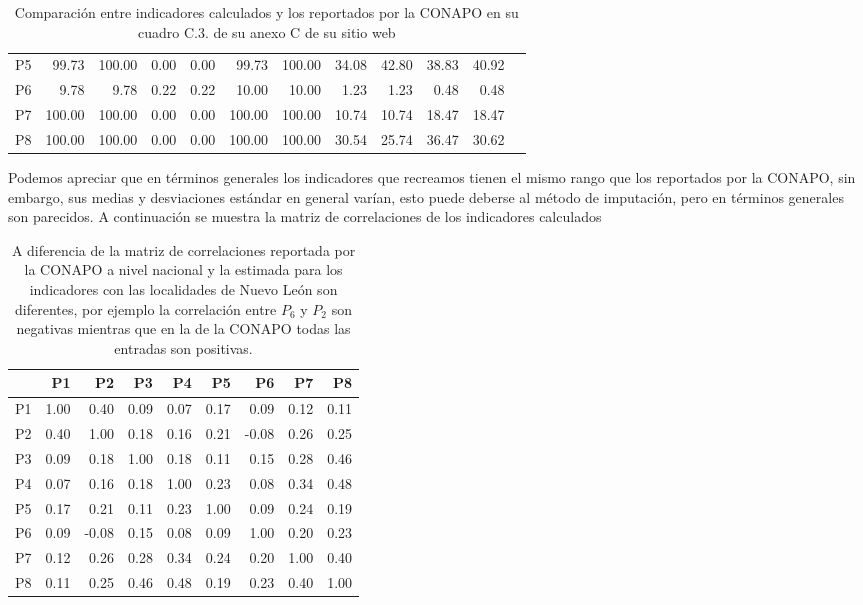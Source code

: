 \documentclass[paper=letter, fontsize=11pt]{scrartcl}
\numberwithin{equation}{section} %
\numberwithin{figure}{section} %
\numberwithin{table}{section} %
\begin{document}
\begin{enumerate}
\begin{enumerate}
\begin{table}[ht]
\begin{tabular}{rrrrrrrrrrrl}
  P5 & 99.73 & 100.00 & 0.00 & 0.00 & 99.73 & 100.00 & 34.08 & 42.80 & 38.83 & 40.92  \\ 
  P6 & 9.78 & 9.78 & 0.22 & 0.22 & 10.00 & 10.00 & 1.23 & 1.23 & 0.48 & 0.48 \\ 
  P7 & 100.00 & 100.00 & 0.00 & 0.00 & 100.00 & 100.00 & 10.74 & 10.74 & 18.47 & 18.47  \\ 
  P8 & 100.00 & 100.00 & 0.00 & 0.00 & 100.00 & 100.00 & 30.54 & 25.74 & 36.47 & 30.62  \\ 
   \hline
\end{tabular}
\caption{Comparación entre indicadores calculados y los reportados por la CONAPO en su cuadro C.3. de su anexo C de su sitio web }
\end{table}

Podemos apreciar que en términos generales los indicadores que recreamos tienen el mismo rango que los reportados por la CONAPO, sin embargo, sus medias y desviaciones estándar en general varían, esto puede deberse al método de imputación, pero en términos generales son parecidos. A continuación se muestra la matriz de correlaciones de los indicadores calculados 
\begin{table}[H]
\centering
\begin{tabular}{rrrrrrrrr}
  \hline
 & P1 & P2 & P3 & P4 & P5 & P6 & P7 & P8 \\ 
  \hline
P1 & 1.00 & 0.40 & 0.09 & 0.07 & 0.17 & 0.09 & 0.12 & 0.11 \\ 
  P2 & 0.40 & 1.00 & 0.18 & 0.16 & 0.21 & -0.08 & 0.26 & 0.25 \\ 
  P3 & 0.09 & 0.18 & 1.00 & 0.18 & 0.11 & 0.15 & 0.28 & 0.46 \\ 
  P4 & 0.07 & 0.16 & 0.18 & 1.00 & 0.23 & 0.08 & 0.34 & 0.48 \\ 
  P5 & 0.17 & 0.21 & 0.11 & 0.23 & 1.00 & 0.09 & 0.24 & 0.19 \\ 
  P6 & 0.09 & -0.08 & 0.15 & 0.08 & 0.09 & 1.00 & 0.20 & 0.23 \\ 
  P7 & 0.12 & 0.26 & 0.28 & 0.34 & 0.24 & 0.20 & 1.00 & 0.40 \\ 
  P8 & 0.11 & 0.25 & 0.46 & 0.48 & 0.19 & 0.23 & 0.40 & 1.00 \\ 
   \hline
\end{tabular}
\caption{A diferencia de la matriz de correlaciones reportada por la CONAPO a nivel nacional y la estimada para los indicadores con las localidades de Nuevo León son diferentes, por ejemplo la correlación entre $P_6$ y $P_2$ son negativas mientras que en la de la CONAPO todas las entradas son positivas.}

\end{table}
\end{enumerate}
\end{enumerate}
\end{document}
